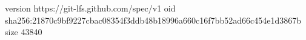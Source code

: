 version https://git-lfs.github.com/spec/v1
oid sha256:21870c9bf9227cbac08354f3ddb48b18996a660c16f7bb52ad66c454e1d3867b
size 43840

